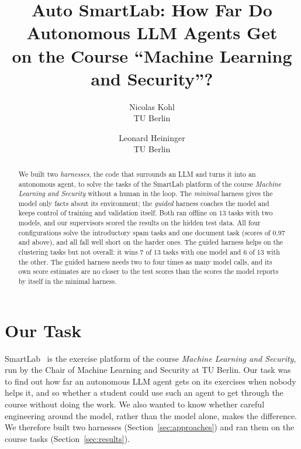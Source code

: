 \documentclass[letterpaper,twocolumn,10pt]{article}
\begin{document}

\date{}

\title{\Large \bf Auto SmartLab: How Far Do Autonomous LLM Agents Get\\
  on the Course ``Machine Learning and Security''?}

\author{
{\rm Nicolas Kohl}\\
TU Berlin
\and
{\rm Leonard Heininger}\\
TU Berlin
} %

\maketitle

\begin{abstract}
We built two \emph{harnesses}, the code that surrounds an LLM and turns it
into an autonomous agent, to solve the tasks of the SmartLab platform of the
course \emph{Machine Learning and Security} without a human in the loop. The
\emph{minimal} harness gives the model only facts about its environment; the
\emph{guided} harness coaches the model and keeps control of training and
validation itself. Both ran offline on 13
tasks with two models, and our supervisors scored the results on the hidden
test data. All four configurations solve the introductory spam tasks and one
document task (scores of 0.97 and above), and all fall well short on the
harder ones. The guided harness helps on the clustering tasks but not
overall: it wins 7 of 13 tasks with one model and 6 of 13 with the other.
The guided harness needs two to four times as many model calls, and its own
score estimates are no closer to the test scores than the scores the model
reports by itself in the minimal harness.
\end{abstract}

\section{Our Task}

SmartLab~\cite{smartlab} is the exercise platform of the course
\emph{Machine Learning and Security}, run by the Chair of Machine Learning
and Security at TU Berlin. Our task was to find out how far an autonomous
LLM agent gets on its exercises when nobody helps it, and so whether a
student could use such an agent to get through the course without doing the
work. We also wanted to know whether careful engineering around the model,
rather than the model alone, makes the difference. We therefore built two
harnesses (Section~\ref{sec:approaches}) and ran them on the course tasks
(Section~\ref{sec:results}).
\end{document}
